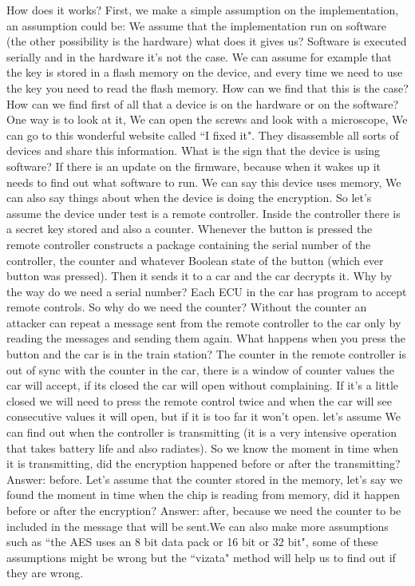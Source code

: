 How does it works? First, we make a simple assumption on the implementation, an assumption could be: We assume that the implementation run on software (the other possibility is the hardware) what does it gives us? Software is executed serially and in the hardware it's not the case. We can assume for example that the key is stored in a flash memory on the device, and every time we need to use the key you need to read the flash memory. How can we find that this is the case? How can we find first of all that a device is on the hardware or on the software? One way is to look at it, We can open the screws and look with a microscope, We can go to this wonderful website called ``I fixed it". They disassemble all sorts of devices and share this information. What is the sign that the device is using software? If there is an update on the firmware, because when it wakes up it needs to find out what software to run. We can say this device uses memory, We can also say things about when the device is doing the encryption. So let's assume the device under test is a remote controller. Inside the controller there is a secret key stored and also a counter. Whenever the button is pressed the remote controller constructs a package containing the serial number of the controller, the counter and whatever Boolean state of the button (which ever button was pressed). Then it sends it to a car and the car decrypts it. Why by the way do we need a serial number? Each ECU in the car has program to accept remote controls. So why do we need the counter? Without the counter an attacker can repeat a message sent from the remote controller to the car only by reading the messages and sending them again. What happens when you press the button and the car is in the train station? The counter in the remote controller is out of sync with the counter in the car, there is a window of counter values the car will accept, if its closed the car will open without complaining. If it's a little closed we will need to press the remote control twice and when the car will see consecutive values it will open, but if it is too far it won't open. let's assume We can find out when the controller is transmitting (it is a very intensive operation that takes battery life and also radiates). So we know the moment in time when it is transmitting, did the encryption happened before or after the transmitting? Answer: before. Let's assume that the counter stored in the memory, let's say we found the moment in time when the chip is reading from memory, did it happen before or after the encryption? Answer: after, because we need the counter to be included in the message that will be sent.We can also make more assumptions such as ``the AES uses an 8 bit data pack or 16 bit or 32 bit", some of these assumptions might be wrong but the ``vizata" method will help us to find out if they are wrong. 

